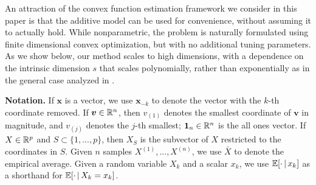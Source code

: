An attraction of the convex function estimation framework we consider
in this paper is that the additive model can be used for convenience,
without assuming it to actually hold.  While nonparametric, the
problem is naturally formulated using finite dimensional convex
optimization, but with no additional tuning parameters.  As we show
below, our method scales to high dimensions, with a dependence on the
intrinsic dimension $s$ that scales polynomially, rather than
exponentially as in the general case analyzed in \cite{dalalyan:12}.


\textbf{Notation.} If
$\mathbf{x}$ is a vector, we use $\mathbf{x}_{-k}$ to denote the
vector with the $k$-th coordinate removed. If $\mbox{\boldmath $v$} \in \mathbb{R}^n$, then
$v_{(1)}$ denotes the smallest coordinate of $\mathbf{v}$ in
magnitude, and $v_{(j)}$ denotes the $j$-th smallest; $\mbox{\boldmath $1$}_n \in \mathbb{R}^n$
is the all ones vector. If $X \in \mathbb{R}^p$ and $S \subset
\{1,...,p\}$, then $X_S$ is the subvector of $X$ restricted to
the coordinates in $S$. Given $n$ samples $X^{(1)},...,X^{(n)}$, we use
$\bar{X}$ to denote the empirical average. Given a random variable $X_k$ and a scalar $x_k$, we use ${\mathbb E}[\cdot {\,|\,} x_k]$ as a shorthand for ${\mathbb E}[ \cdot {\,|\,} X_k = x_k]$.


%
%
%
%
%
%
%
%
